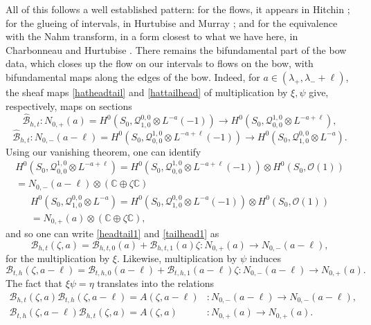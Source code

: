 \documentclass[12pt]{article}
\theoremstyle{definition}
\theoremstyle{remark}
\numberwithin{theorem}{section}
\def\bC{{\mathbb {C}}}
\def\pB{{\mathcal B}}
\def\pO{{\mathcal O}}
\def\pQ{{\mathcal Q}}
\begin{document}
All of this follows a well established pattern: for the flows, it appears in Hitchin \cite{Hitchin:1983ay};  for the glueing of intervals, in Hurtubise and Murray \cite{HurtubiseMurray}; and for the equivalence with the Nahm transform, in a form closest to what we have here, in  Charbonneau and Hurtubise \cite{Charbonneau:2007zd}. There remains the bifundamental part of the bow data, which closes up the flow on our intervals to flows on the bow, with bifundamental maps along the edges of the bow. Indeed, for $a\in (\lambda_+, \lambda_-+\ell)$, the sheaf maps \eqref{hatheadtail} and \eqref{hattailhead} of multiplication by $\xi, \psi$ give, respectively, maps on sections
\begin{equation} \label{headtail1} \widehat \pB_{h,t}: N_{0,+}(a) = H^0(S_0, \pQ_{ 1,0}^{0,0}\otimes L^{-a} (-1)) \rightarrow  H^0(S_0, \pQ_{0 ,0}^{ 1,0}\otimes L^{ -a+\ell}), \end{equation}
\begin{equation} \label{tailhead1} \widehat \pB_{h,t}: N_{0,-}(a-\ell)=  H^0(S_0,  \pQ^{ 1,0}_{0,0}\otimes L^{-a+\ell}(-1))\rightarrow   H^0(S_0, \pQ^{0 ,0}_{ 1,0}\otimes L^{-a}).\end{equation}
Using our vanishing theorem, one can identify 
\begin{multline*}
H^0(S_0, \pQ_{0 ,0}^{ 1,0}\otimes L^{ -a+\ell}) = H^0(S_0, \pQ_{0 ,0}^{ 1,0}\otimes L^{ -a+\ell}(-1))\otimes H^0(S_0,\pO(1))\\ 
= N_{0,-}(a-\ell)\otimes (\bC\oplus \zeta\bC)
\end{multline*}
\begin{multline*}
H^0(S_0, \pQ^{0 ,0}_{ 1,0}\otimes L^{-a}) = H^0(S_0, \pQ^{0 ,0}_{ 1,0}\otimes L^{-a}(-1)) \otimes H^0(S_0,\pO(1))\\ =  N_{0,+}(a)\otimes (\bC\oplus \zeta\bC),
\end{multline*}
and so one can write \eqref{headtail1} and \eqref{tailhead1} as
\begin{equation} \label{head-tail} \pB_{h,t}(\zeta, a) =  \pB_{h,t,0}(a)+   \pB_{h,t,1}(a)\zeta : N_{0,+}(a)   \rightarrow N_{0,-}(a-\ell) , \end{equation}
for the multiplication by $\xi.$ Likewise, multiplication by $\psi$ induces 
\begin{equation} \label{tail-head}  \pB_{t,h}(\zeta,a-\ell) =  \pB_{t,h,0}(a-\ell)+  \pB_{t,h,1}(a-\ell)\zeta:N_{0,-}(a-\ell)\rightarrow   N_{0,+}(a).\end{equation}
The fact that $\xi\psi = \eta$ translates into the relations
\begin{align}
\pB_{h,t}(\zeta, a)  \pB_{t,h}(\zeta,a-\ell) =A(\zeta,a-\ell)& : N_{0,-}(a-\ell)\rightarrow N_{0,-}(a-\ell),\\
 \pB_{t,h}(\zeta,a-\ell)\pB_{h,t}(\zeta, a) =  A(\zeta,a )&: N_{0,+}(a)\rightarrow  N_{0,+}(a).
 \end{align}
 
\end{document}
